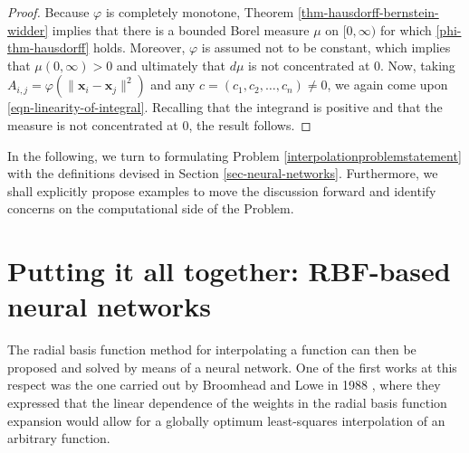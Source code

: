 \documentclass[12pt]{report} %
\newcommand{\tmmathbf}[1]{\ensuremath{\boldsymbol{#1}}}
\begin{document}
\begin{proof}
  Because $\varphi$ is completely monotone, Theorem
  \ref{thm-hausdorff-bernstein-widder} implies that there is a bounded Borel
  measure $\mu$ on $[0, \infty)$ for which \eqref{phi-thm-hausdorff} holds.
  Moreover, $\varphi$ is assumed not to be constant, which implies that $\mu (0,
    \infty) > 0$ and ultimately that $d \mu$ is not concentrated at $0$. Now,
  taking $A_{i, j} = \varphi (\| \tmmathbf{x}_i -\tmmathbf{x}_j \|^2)$ and any
  $c = (c_1, c_2, \ldots, c_n) \neq 0$, we again come upon
  \eqref{eqn-linearity-of-integral}. Recalling that the integrand is positive
  and that the measure is not concentrated at $0$, the result follows.
\end{proof}

In the following, we turn to formulating Problem \ref{interpolationproblemstatement}
with the definitions devised in Section \ref{sec-neural-networks}. Furthermore,
we shall explicitly propose examples to move the discussion forward and identify
concerns on the computational side of the Problem.

\section{Putting it all together: RBF-based neural networks}\label{sec:rbf-based-neural-networks}

The radial basis function method for interpolating a function can then be
proposed and solved by means of a neural network. One of the first works at
this respect was the one carried out by Broomhead and Lowe in 1988
  {\cite{broomhead1988multivariable}}, where they expressed that the linear
dependence of the weights in the radial basis function expansion would allow
for a globally optimum least-squares interpolation of an arbitrary function.
\end{document}
